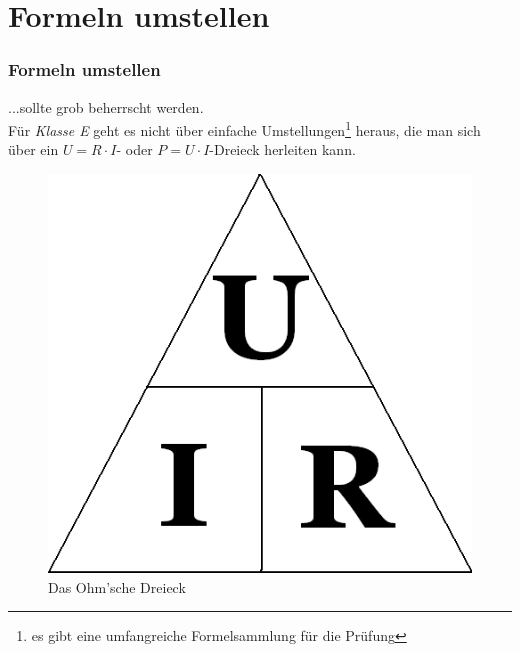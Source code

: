 %


\section{Formeln umstellen}

\begin{frame}
  \frametitle{Formeln umstellen}
	\vspace{5mm}
  ...sollte grob beherrscht werden. \\[2em]

  Für \emph{Klasse E} geht es nicht über einfache Umstellungen\footnote{es
  gibt eine umfangreiche Formelsammlung für die Prüfung} heraus, die man sich über ein
  $U = R\cdot I$- oder $P = U\cdot I$-Dreieck herleiten kann.

  \begin{center}
    \begin{figure}
      \includegraphics[height=.4\textheight]{e03/Ohm_law_triangle.png}
      \caption{Das Ohm'sche Dreieck \cite{ohm_dreieck}}
      \label{fig_ohm_dreieck}
    \end{figure}
  \end{center}

\end{frame}

